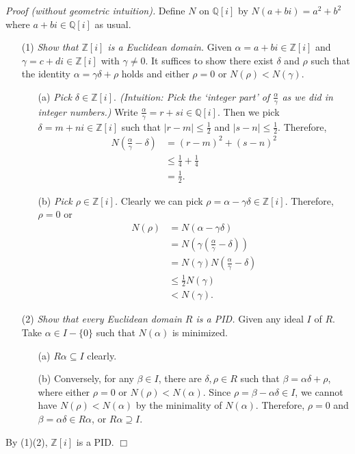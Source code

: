 \documentclass{article}
\begin{document}
\emph{Proof (without geometric intuition).}
Define $N$ on $\mathbb{Q}[i]$ by $N(a+bi) = a^2+b^2$ where
$a+bi \in \mathbb{Q}[i]$ as usual.
\begin{enumerate}
\item[(1)]
\emph{Show that $\mathbb{Z}[i]$ is a Euclidean domain.}
Given $\alpha = a+bi \in \mathbb{Z}[i]$ and
$\gamma = c+di \in \mathbb{Z}[i]$ with $\gamma \neq 0$.
It suffices to show there exist $\delta$ and $\rho$ such that the identity
$\alpha = \gamma\delta + \rho$ holds and
either $\rho = 0$ or $N(\rho) < N(\gamma)$.
\begin{enumerate}
\item[(a)]
\emph{Pick $\delta \in \mathbb{Z}[i].$
(Intuition: Pick the `integer part' of $\frac{\alpha}{\gamma}$
as we did in integer numbers.)}
Write $\frac{\alpha}{\gamma} = r+si \in \mathbb{Q}[i]$.
Then we pick $\delta = m+ni \in \mathbb{Z}[i]$ such that
$|r-m| \leq \frac{1}{2}$ and $|s-n| \leq \frac{1}{2}$.
Therefore,
\begin{align*}
N\left( \frac{\alpha}{\gamma} - \delta \right)
&= (r-m)^2 + (s-n)^2 \\
&\leq \frac{1}{4} + \frac{1}{4} \\
&= \frac{1}{2}.
\end{align*}
\item[(b)]
\emph{Pick $\rho \in \mathbb{Z}[i]$.}
Clearly we can pick $\rho = \alpha - \gamma\delta \in \mathbb{Z}[i]$.
Therefore, $\rho = 0$ or
\begin{align*}
N(\rho)
&= N(\alpha - \gamma\delta) \\
&= N\left( \gamma\left( \frac{\alpha}{\gamma} - \delta \right) \right) \\
&= N(\gamma) N\left( \frac{\alpha}{\gamma} - \delta \right) \\
&\leq \frac{1}{2} N(\gamma) \\
&< N(\gamma).
\end{align*}
\end{enumerate}
\item[(2)]
\emph{Show that every Euclidean domain $R$ is a PID.}
Given any ideal $I$ of $R$.
Take $\alpha \in I-\{0\}$ such that $N(\alpha)$ is minimized.
\begin{enumerate}
  \item[(a)]
  $R\alpha \subseteq I$ clearly.
  \item[(b)]
  Conversely, for any $\beta \in I$, there are $\delta, \rho \in R$
  such that $\beta = \alpha \delta + \rho$, where either $\rho = 0$
  or $N(\rho) < N(\alpha)$.
  Since $\rho = \beta - \alpha \delta \in I$,
  we cannot have $N(\rho) < N(\alpha)$ by the minimality of $N(\alpha)$.
  Therefore, $\rho = 0$ and $\beta = \alpha \delta \in R\alpha$,
  or $R\alpha \supseteq I$.
\end{enumerate}
\end{enumerate}
By (1)(2),
$\mathbb{Z}[i]$ is a PID.
$\Box$ \\\\
\end{document}
